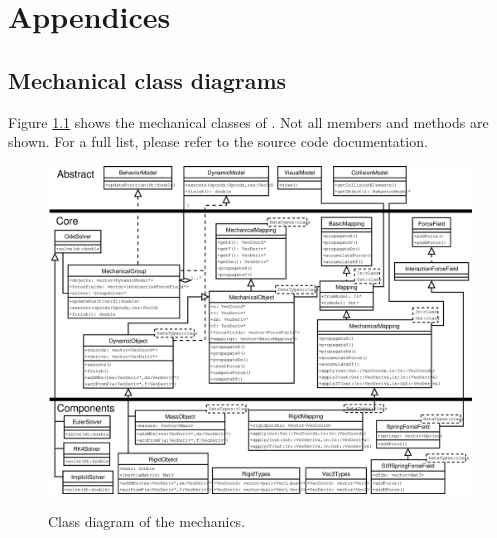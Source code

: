 \appendix
\chapter{Appendices} \label{chap:appendices}

\section{Mechanical class diagrams} \label{sec:umlmeca}
Figure \ref{fig:umlMechClasses} shows the mechanical classes of \sofa. Not all members and methods are shown. For a full list, please refer to the source code documentation.

\begin{figure}[htp]
	\hspace{-2cm}
	\includegraphics*[width=20cm]{fig/uml-mechanical-classes.eps}  
\label{fig:umlMechClasses} 
\caption{Class diagram of the mechanics.}
\end{figure}

